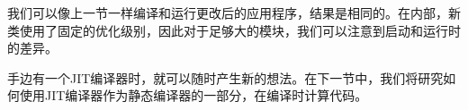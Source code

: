 我们可以像上一节一样编译和运行更改后的应用程序，结果是相同的。在内部，新类使用了固定的优化级别，因此对于足够大的模块，我们可以注意到启动和运行时的差异。\par

手边有一个JIT编译器时，就可以随时产生新的想法。在下一节中，我们将研究如何使用JIT编译器作为静态编译器的一部分，在编译时计算代码。\par













